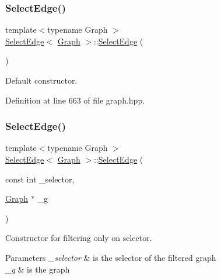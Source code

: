 \subsubsection{\texorpdfstring{Select\+Edge()}{SelectEdge()}\hspace{0.1cm}{\footnotesize\ttfamily [1/3]}}
{\footnotesize\ttfamily template$<$typename Graph $>$ \\
\hyperlink{structSelectEdge}{Select\+Edge}$<$ \hyperlink{structGraph}{Graph} $>$\+::\hyperlink{structSelectEdge}{Select\+Edge} (\begin{DoxyParamCaption}{ }\end{DoxyParamCaption})\hspace{0.3cm}{\ttfamily [inline]}}



Default constructor. 



Definition at line 663 of file graph.\+hpp.

\mbox{\label{structSelectEdge_a55138a44b9aff43a9fd253c4618cb1b2}} 
\subsubsection{\texorpdfstring{Select\+Edge()}{SelectEdge()}\hspace{0.1cm}{\footnotesize\ttfamily [2/3]}}
{\footnotesize\ttfamily template$<$typename Graph $>$ \\
\hyperlink{structSelectEdge}{Select\+Edge}$<$ \hyperlink{structGraph}{Graph} $>$\+::\hyperlink{structSelectEdge}{Select\+Edge} (\begin{DoxyParamCaption}\item[{const int}]{\+\_\+selector,  }\item[{\hyperlink{structGraph}{Graph} $\ast$}]{\+\_\+g }\end{DoxyParamCaption})\hspace{0.3cm}{\ttfamily [inline]}}



Constructor for filtering only on selector. 


\begin{DoxyParams}{Parameters}
{\em \+\_\+selector} & is the selector of the filtered graph \\
\hline
{\em \+\_\+g} & is the graph \\
\hline
\end{DoxyParams}


